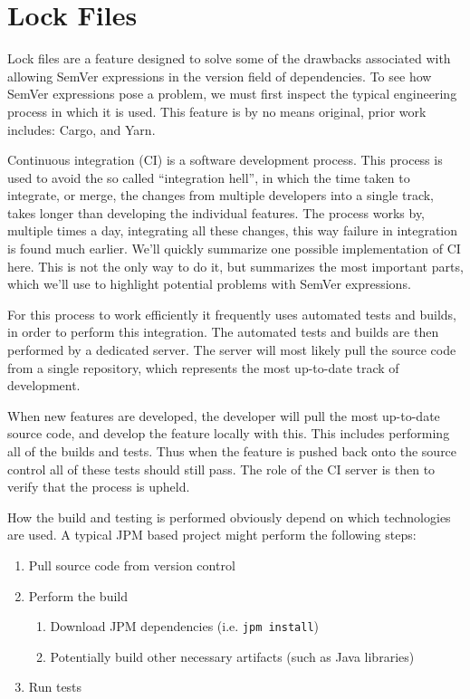 \section{Lock Files}
\label{sec:lockfiles}


Lock files are a feature designed to solve some of the drawbacks associated
with allowing SemVer expressions in the version field of dependencies. To see
how SemVer expressions pose a problem, we must first inspect the typical
engineering process in which it is used. This feature is by no means original,
prior work includes: Cargo\autocite{CRAA}, and Yarn\autocite{YARNB}.

Continuous integration (CI) is a software development process\autocite{MFCI}.
This process is used to avoid the so called ``integration hell'', in which the
time taken to integrate, or merge, the changes from multiple developers into a
single track, takes longer than developing the individual features.  The
process works by, multiple times a day, integrating all these changes, this way
failure in integration is found much earlier. We'll quickly summarize one
possible implementation of CI here. This is not the only way to do it, but
summarizes the most important parts, which we'll use to highlight potential
problems with SemVer expressions.

For this process to work efficiently it frequently uses automated tests and
builds, in order to perform this integration. The automated tests and builds
are then performed by a dedicated server. The server will most likely pull the
source code from a single repository, which represents the most up-to-date
track of development.

When new features are developed, the developer will pull the most up-to-date
source code, and develop the feature locally with this. This includes
performing all of the builds and tests. Thus when the feature is pushed back
onto the source control all of these tests should still pass. The role of the
CI server is then to verify that the process is upheld.

How the build and testing is performed obviously depend on which technologies
are used. A typical JPM based project might perform the following steps:

\begin{enumerate}
\item Pull source code from version control
\item Perform the build
    \begin{enumerate}
        \item Download JPM dependencies (i.e. \verb!jpm install!)
        \item Potentially build other necessary artifacts (such as Java
                libraries)
    \end{enumerate}
\item Run tests
\end{enumerate}

